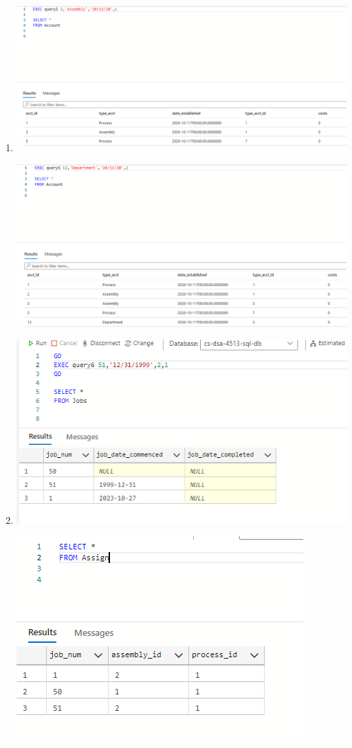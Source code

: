 \documentclass[11pt]{article}
\begin{document}
\begin{enumerate}
\item %
\includegraphics[width = \textwidth]{insertAcct1.png}

\includegraphics[width = \textwidth]{insertAcct2.png}

\item %

\includegraphics[width = \textwidth]{insertJobs1.png}

\includegraphics[width = \textwidth]{insertJobs2.png}



\end{enumerate}
\end{document}
